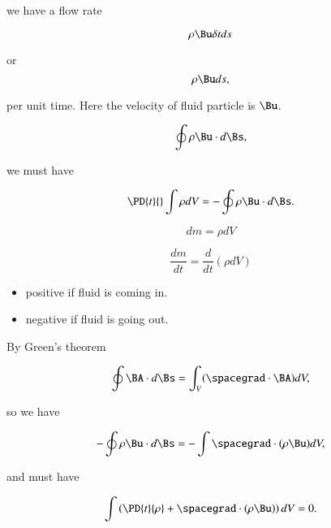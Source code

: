 we have a flow rate

\begin{equation}\label{eqn:continuumL9:310}
\rho \Bu \delta t ds
\end{equation}

or 
\begin{equation}\label{eqn:continuumL9:330}
\rho \Bu ds,
\end{equation}

per unit time.  Here the velocity of fluid particle is $\Bu$.

\begin{equation}\label{eqn:continuumL9:350}
\oint \rho \Bu \cdot d\Bs,
\end{equation}

we must have

\begin{equation}\label{eqn:continuumL9:710}
\PD{t}{} \int \rho dV 
=
-\oint \rho \Bu \cdot d\Bs.
\end{equation}

\begin{equation}\label{eqn:continuumL9:370}
dm = \rho dV
\end{equation}

\begin{equation}\label{eqn:continuumL9:390}
\frac{dm}{dt} = \frac{d}{dt} (\rho dV)
\end{equation}

\begin{itemize}
\item 
positive if fluid is coming in.
\item 
negative if fluid is going out.
\end{itemize}

By Green's theorem

\begin{equation}\label{eqn:continuumL9:410}
\oint \BA \cdot d\Bs = \int_V (\spacegrad \cdot \BA) dV,
\end{equation}

so we have

\begin{equation}\label{eqn:continuumL9:430}
-\oint \rho \Bu \cdot d\Bs = -\int \spacegrad \cdot (\rho \Bu ) dV,
\end{equation}

and must have

\begin{equation}\label{eqn:continuumL9:450}
\int \left( \PD{t}{\rho} + \spacegrad \cdot (\rho \Bu) \right) dV = 0.
\end{equation}

